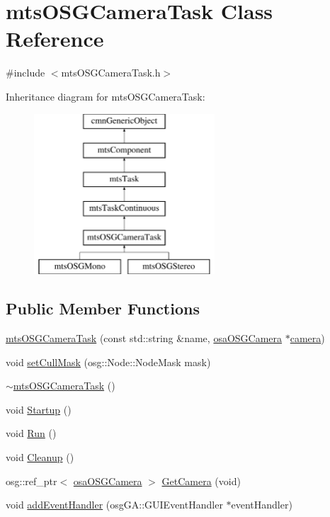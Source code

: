 \hypertarget{classmts_o_s_g_camera_task}{\section{mts\-O\-S\-G\-Camera\-Task Class Reference}
\label{classmts_o_s_g_camera_task}
}


{\ttfamily \#include $<$mts\-O\-S\-G\-Camera\-Task.\-h$>$}

Inheritance diagram for mts\-O\-S\-G\-Camera\-Task\-:\begin{figure}[H]
\begin{center}
\leavevmode
\includegraphics[height=6.000000cm]{de/d6e/classmts_o_s_g_camera_task}
\end{center}
\end{figure}
\subsection*{Public Member Functions}
\begin{DoxyCompactItemize}
\item 
\hyperlink{classmts_o_s_g_camera_task_a534e20ad8b48af77e77a6b351ff91534}{mts\-O\-S\-G\-Camera\-Task} (const std\-::string \&name, \hyperlink{classosa_o_s_g_camera}{osa\-O\-S\-G\-Camera} $\ast$\hyperlink{classmts_o_s_g_camera_task_acdbb6886bc066f06c2fb26be44b60534}{camera})
\item 
void \hyperlink{classmts_o_s_g_camera_task_adfe692d057b79007c782d1dc3cb96746}{set\-Cull\-Mask} (osg\-::\-Node\-::\-Node\-Mask mask)
\item 
\hyperlink{classmts_o_s_g_camera_task_a0e5a701e5517c8f272ee4cb62751c962}{$\sim$mts\-O\-S\-G\-Camera\-Task} ()
\item 
void \hyperlink{classmts_o_s_g_camera_task_a4fcd1a7364cc5f6cb05951f361ea0568}{Startup} ()
\item 
void \hyperlink{classmts_o_s_g_camera_task_a017d41a7a6dbfced2a43c81daa98e6a0}{Run} ()
\item 
void \hyperlink{classmts_o_s_g_camera_task_a814157c6b87931efb472fb6aedb69174}{Cleanup} ()
\item 
osg\-::ref\-\_\-ptr$<$ \hyperlink{classosa_o_s_g_camera}{osa\-O\-S\-G\-Camera} $>$ \hyperlink{classmts_o_s_g_camera_task_a1ea4dc187d6f023fef7fd25b18ad5c65}{Get\-Camera} (void)
\item 
void \hyperlink{classmts_o_s_g_camera_task_afd090cb089b7dec5a4cd32c228a2cda7}{add\-Event\-Handler} (osg\-G\-A\-::\-G\-U\-I\-Event\-Handler $\ast$event\-Handler)
\end{DoxyCompactItemize}
